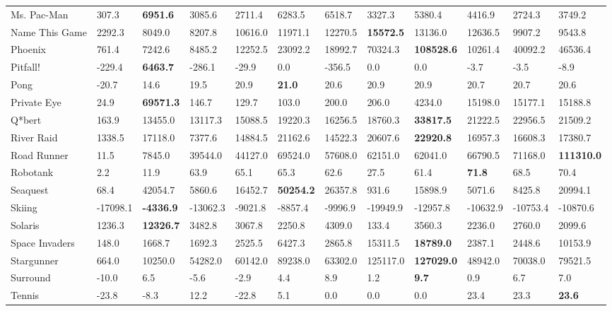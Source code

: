 \begin{tabular}{| p{2.4cm} p{0.84cm} p{0.84cm} p{0.84cm} p{0.84cm} p{0.84cm} p{0.84cm} p{0.84cm} p{0.84cm} p{0.84cm} p{0.84cm} p{0.84cm} |}
Ms. Pac-Man & 307.3 & {\bf 6951.6} & 3085.6 & 2711.4 & 6283.5 & 6518.7 & 3327.3 & 5380.4 & 4416.9 & 2724.3 & 3749.2\\
Name This Game & 2292.3 & 8049.0 & 8207.8 & 10616.0 & 11971.1 & 12270.5 & {\bf 15572.5} & 13136.0 & 12636.5 & 9907.2 & 9543.8\\
Phoenix & 761.4 & 7242.6 & 8485.2 & 12252.5 & 23092.2 & 18992.7 & 70324.3 & {\bf 108528.6} & 10261.4 & 40092.2 & 46536.4\\
Pitfall!  & -229.4 & {\bf 6463.7} & -286.1 & -29.9 & 0.0 & -356.5 & 0.0 & 0.0 & -3.7 & -3.5 & -8.9\\
Pong & -20.7 & 14.6 & 19.5 & 20.9 & {\bf 21.0} & 20.6 & 20.9 & 20.9 & 20.7 & 20.7 & 20.6\\
Private Eye & 24.9 & {\bf 69571.3} & 146.7 & 129.7 & 103.0 & 200.0 & 206.0 & 4234.0 & 15198.0 & 15177.1 & 15188.8\\
Q*bert & 163.9 & 13455.0 & 13117.3 & 15088.5 & 19220.3 & 16256.5 & 18760.3 & {\bf 33817.5} & 21222.5 & 22956.5 & 21509.2\\
River Raid & 1338.5 & 17118.0 & 7377.6 & 14884.5 & 21162.6 & 14522.3 & 20607.6 & {\bf 22920.8} & 16957.3 & 16608.3 & 17380.7\\
Road Runner & 11.5 & 7845.0 & 39544.0 & 44127.0 & 69524.0 & 57608.0 & 62151.0 & 62041.0 & 66790.5 & 71168.0 & {\bf 111310.0}\\
Robotank & 2.2 & 11.9 & 63.9 & 65.1 & 65.3 & 62.6 & 27.5 & 61.4 & {\bf 71.8} & 68.5 & 70.4\\
Seaquest & 68.4 & 42054.7 & 5860.6 & 16452.7 & {\bf 50254.2} & 26357.8 & 931.6 & 15898.9 & 5071.6 & 8425.8 & 20994.1\\
Skiing & -17098.1 & {\bf -4336.9} & -13062.3 & -9021.8 & -8857.4 & -9996.9 & -19949.9 & -12957.8 & -10632.9 & -10753.4 & -10870.6\\
Solaris & 1236.3 & {\bf 12326.7} & 3482.8 & 3067.8 & 2250.8 & 4309.0 & 133.4 & 3560.3 & 2236.0 & 2760.0 & 2099.6\\
Space Invaders & 148.0 & 1668.7 & 1692.3 & 2525.5 & 6427.3 & 2865.8 & 15311.5 & {\bf 18789.0} & 2387.1 & 2448.6 & 10153.9\\
Stargunner & 664.0 & 10250.0 & 54282.0 & 60142.0 & 89238.0 & 63302.0 & 125117.0 & {\bf 127029.0} & 48942.0 & 70038.0 & 79521.5\\
Surround & -10.0 & 6.5 & -5.6 & -2.9 & 4.4 & 8.9 & 1.2 & {\bf 9.7} & 0.9 & 6.7 & 7.0\\
Tennis & -23.8 & -8.3 & 12.2 & -22.8 & 5.1 & 0.0 & 0.0 & 0.0 & 23.4 & 23.3 & {\bf 23.6}\\

\end{tabular}
